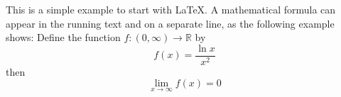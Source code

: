 \documentclass{article}
\begin{document}
This is a simple example to start with \LaTeX.
A mathematical formula can appear in the running text and
on a separate line, as the following example shows:
\bigskip
Define the function $f:(0,\infty)\to\mathbb{R}$ by
\begin{displaymath} f(x) = \frac{\ln x}{x^2} \end{displaymath}
then
$$ \lim_{x\to\infty} f(x)=0 $$
\end{document}
